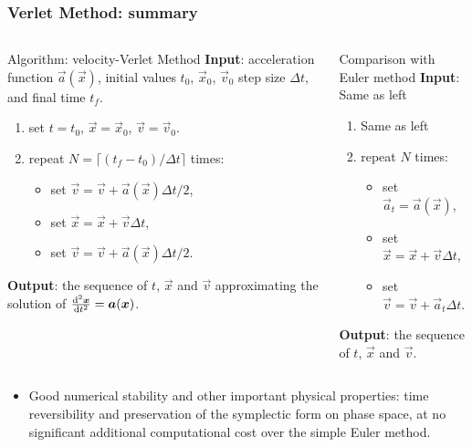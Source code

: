 \documentclass[11pt,aspectratio=169,handout]{beamer}
\begin{document}
\begin{frame}
\frametitle{Verlet Method: summary}

\begin{columns}[c]


\begin{block}{Algorithm: velocity-Verlet Method}
	\pause
	\textbf{Input}: acceleration function $\vec{a}(\vec{x})$, initial values $t_0$, $\vec{x}_0$, $\vec{v}_0$ step size $\Delta t$, and final time $t_f$. 
	\pause
	\begin{enumerate}
		\item set $t=t_0$, $\vec{x}=\vec{x}_0$, $\vec{v}=\vec{v}_0$. 
	
		\item repeat $N = \lceil (t_f-t_0)/\Delta t\rceil$ times:
		\pause
		\begin{itemize}
			\item set $\vec{v} = \vec{v} + \vec{a}(\vec{x})\Delta t / 2$,
			\pause
			\item set $\vec{x} = \vec{x} + \vec{v}\Delta t$,
			\pause
			\item set  $\vec{v} = \vec{v} + \vec{a}(\vec{x})\Delta t / 2$.
		\end{itemize}		
	\end{enumerate}  
	\pause
	\textbf{Output}: the sequence of $t$, $\vec{x}$ and $\vec{v}$ approximating the solution of $\frac{{\rm {d}}^2 \boldsymbol{x}}{{\rm {d}} t^2} = \boldsymbol{a}(\boldsymbol{x})$.
\end{block}
\pause
\begin{alertblock}{Comparison with Euler method}
	\pause
	\textbf{Input}: Same as left
	\pause
	\begin{enumerate}
		\item Same as left
		
		\item repeat $N$ times:
		\pause
		\begin{itemize}
			\item set $\vec{a}_t = \vec{a}(\vec{x})$,
			\pause
			\item set $\vec{x} = \vec{x} + \vec{v}\Delta t$,
			\pause
			\item set  $\vec{v} = \vec{v} + \vec{a}_t\Delta t$.
		\end{itemize}		
	\end{enumerate}  
	\pause
	\textbf{Output}: the sequence of $t$, $\vec{x}$ and $\vec{v}$.
\end{alertblock}

\end{columns}
\vspace{0.4cm}
\begin{itemize}
	\item Good numerical stability and other important physical properties: time reversibility and preservation of the symplectic form on phase space, at no significant additional computational cost over the simple Euler method.
\end{itemize}
\end{frame}
\end{document}
